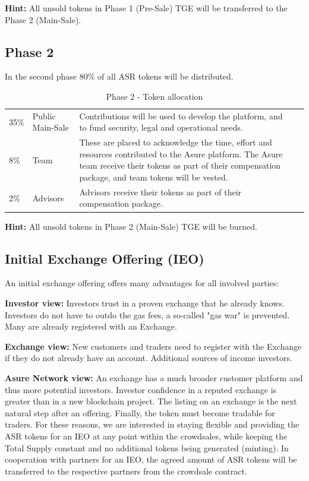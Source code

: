 \textbf{Hint:} All unsold tokens in Phase 1 (Pre-Sale) TGE will be transferred to the Phase 2 (Main-Sale).

\newpage

\subsection{Phase 2}

In the second phase 80\% of all ASR tokens will be distributed.

\begin{table}[H]
\begin{tabular}{llp{}l}
  35\% & Public Main-Sale & Contributions will be used to develop the platform, and to fund security, legal and operational needs. \\
  8\% & Team  & These are placed to acknowledge the time, effort and resources contributed to the Asure platform.  The Asure team receive their tokens as part of their compensation package, and team tokens will be vested.\\
  2\% & Advisors & Advisors receive their tokens as part of their compensation package.
\end{tabular}
\caption{\label{tab:table-name} Phase 2 - Token allocation}
\end{table}

\textbf{Hint:} All unsold tokens in Phase 2 (Main-Sale) TGE  will be burned.

\subsection{Initial Exchange Offering (IEO)}
An initial exchange offering offers many advantages for all involved parties:

\textbf{Investor view:}
Investors trust in a proven exchange that he already knows.
Investors do not have to outdo the gas fees, a so-called "gas war" is prevented.
Many are already registered with an Exchange.

\textbf{Exchange view:}
New customers and traders need to register with the Exchange if they do not already have an account. Additional sources of income investors.

\textbf{Asure Network view:}
An exchange has a much broader customer platform and thus more potential investors.
Investor confidence in a reputed exchange is greater than in a new blockchain project.
The listing on an exchange is the next natural step after an offering. Finally, the token must become tradable for traders.
\newline\newline
For these reasons, we are interested in staying flexible and providing the ASR tokens for an IEO at any point within the crowdsales, while keeping the Total Supply constant and no additional tokens being generated (minting). In cooperation with partners for an IEO, the agreed amount of ASR tokens will be transferred to the respective partners from the crowdsale contract.


